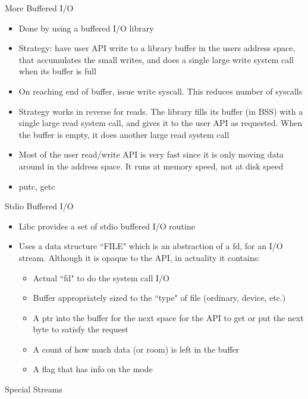 More Buffered I/O
\begin{itemize}
    \item Done by using a buffered I/O library
    \item Strategy: have user API write to a library buffer in the users address space, that accumulates the small writes, and does a single large write system call when its buffer is full
    \item On reaching end of buffer, issue write syscall. This reduces number of syscalls
    \item Strategy works in reverse for reads. The library fills its buffer (in BSS) with a single large read system call, and gives it to the user API as requested. When the buffer is empty, it does another large read system call
    \item Most of the user read/write API is very fast since it is only moving data around in the address space. It runs at memory speed, not at disk speed
    \item putc, getc
\end{itemize}
Stdio Buffered I/O
\begin{itemize}
    \item Libc provides a set of stdio buffered I/O routine
    \item Uses a data structure ``FILE" which is an abstraction of a fd, for an I/O stream. Although it is opaque to the API, in actuality it contains:
    \begin{itemize}
        \item Actual ``fd" to do the system call I/O
        \item Buffer appropriately sized to the ``type" of file (ordinary, device, etc.)
        \item A ptr into the buffer for the next space for the API to get or put the next byte to satisfy the request
        \item A count of how much data (or room) is left in the buffer
        \item A flag that has info on the mode
    \end{itemize}
\end{itemize}
Special Streams
